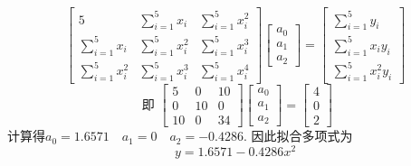 \begin{tcolorbox}
$$\left[\begin{array}{ccl}5 & \sum\limits_{i=1}^{5} x_{i} & \sum\limits_{i=1}^{5} x_{i}^{2} \\ \sum\limits_{i=1}^{5} x_{i} & \sum\limits_{i=1}^{5} x_{i}^{2} & \sum\limits_{i=1}^{5} x_{i}^{3} \\ \sum\limits_{i=1}^{5} x_{i}^{2} & \sum\limits_{i=1}^{5} x_{i}^{3} & \sum\limits_{i=1}^{5} x_{i}^{4}\end{array}\right]\left[\begin{array}{l}a_{0} \\ a_{1} \\ a_{2}\end{array}\right]=\left[\begin{array}{c}\sum\limits_{i=1}^{5} y_{i} \\ \sum\limits_{i=1}^{5} x_{i} y_{i} \\ \sum\limits_{i=1}^{5} x_{i}^{2} y_{i}\end{array}\right]$$
$$  \text { 即 }\left[\begin{array}{ccc}5 & 0 & 10 \\ 0 & 10 & 0 \\ 10 & 0 & 34\end{array}\right]\left[\begin{array}{l}a_{0} \\ a_{1} \\ a_{2}\end{array}\right]=\left[\begin{array}{l}4 \\ 0 \\ 2\end{array}\right]  $$
计算得$a_{0}=1.6571 \quad a_{1}=0 \quad a_{2}=-0.4286$.
因此拟合多项式为
$$
y=1.6571-0.4286 x^{2}
$$


\end{tcolorbox}

